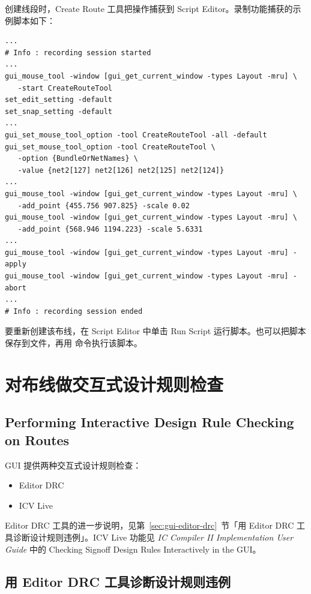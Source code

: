 创建线段时，Create Route 工具把操作捕获到 Script Editor。录制功能捕获的示例脚本如下：
\begin{lstlisting}
...
# Info : recording session started
...
gui_mouse_tool -window [gui_get_current_window -types Layout -mru] \
   -start CreateRouteTool
set_edit_setting -default
set_snap_setting -default
...
gui_set_mouse_tool_option -tool CreateRouteTool -all -default
gui_set_mouse_tool_option -tool CreateRouteTool \
   -option {BundleOrNetNames} \
   -value {net2[127] net2[126] net2[125] net2[124]}
...
gui_mouse_tool -window [gui_get_current_window -types Layout -mru] \
   -add_point {455.756 907.825} -scale 0.02
gui_mouse_tool -window [gui_get_current_window -types Layout -mru] \
   -add_point {568.946 1194.223} -scale 5.6331
...
gui_mouse_tool -window [gui_get_current_window -types Layout -mru] -apply
gui_mouse_tool -window [gui_get_current_window -types Layout -mru] -abort
...
# Info : recording session ended
\end{lstlisting}

要重新创建该布线，在 Script Editor 中单击 Run Script 运行脚本。也可以把脚本保存到文件，再用 \cmd{source} 命令执行该脚本。

\section{对布线做交互式设计规则检查}
\subsection*{Performing Interactive Design Rule Checking on Routes}
\label{sec:gui-route-drc}

GUI 提供两种交互式设计规则检查：
\begin{itemize}
  \item Editor DRC
  \item ICV Live
\end{itemize}

\begin{seeAlsoBox}
Editor DRC 工具的进一步说明，见第~\ref{sec:gui-editor-drc}~节「用 Editor DRC 工具诊断设计规则违例」。ICV Live 功能见 \textit{IC Compiler II Implementation User Guide} 中的 Checking Signoff Design Rules Interactively in the GUI。
\end{seeAlsoBox}

\subsection{用 Editor DRC 工具诊断设计规则违例}
